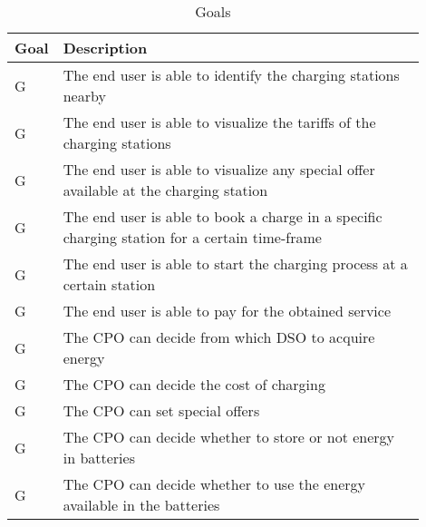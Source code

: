 \setcounter{gc}{1}
\newcommand{\gcnt}{\thegc\stepcounter{gc}}
\begin{table}[H]
    \centering
    \begin{tabular}{|l|p{0.9\linewidth}|}
     \hline
     \textbf{Goal} & \textbf{Description} \\
     \hline
     G\gcnt & The end user is able to identify the charging stations nearby \\
     \hline
     G\gcnt & The end user is able to visualize the tariffs of the charging stations \\
     \hline
     G\gcnt & The end user is able to visualize any special offer available at the charging station \\
     \hline
     G\gcnt & The end user is able to book a charge in a specific charging station for a certain time-frame\\
     \hline
     G\gcnt & The end user is able to start the charging process at a certain station \\
     \hline
     G\gcnt & The end user is able to pay for the obtained service \\
     \hline
     G\gcnt & The CPO can decide from which DSO to acquire energy \\
     \hline 
     G\gcnt & The CPO can decide the cost of charging \\
     \hline 
     G\gcnt & The CPO can set special offers \\
     \hline 
     G\gcnt & The CPO can decide whether to store or not energy in batteries \\
     \hline 
     G\gcnt & The CPO can decide whether to use the energy available in the batteries \\
     \hline 
\end{tabular}
    \caption{Goals}
    \label{tab:Goals}
\end{table}


